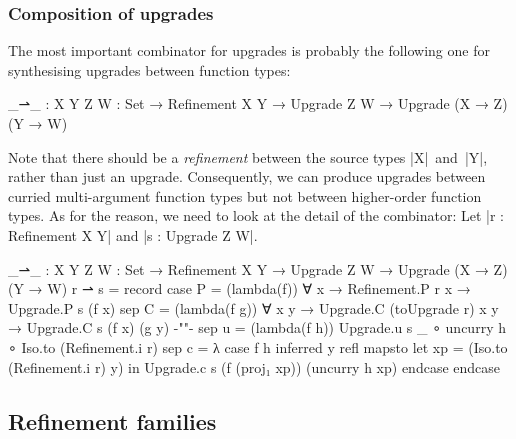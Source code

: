 \subsubsection{Composition of upgrades}
The most important combinator for upgrades is probably the following one for synthesising upgrades between function types:
\begin{code}
_⇀_ :  {X Y Z W : Set} →
       Refinement X Y → Upgrade Z W → Upgrade (X → Z) (Y → W)
\end{code}
Note that there should be a \emph{refinement} between the source types |X|~and~|Y|, rather than just an upgrade.
Consequently, we can produce upgrades between curried multi-argument function types but not between higher-order function types.
As for the reason, we need to look at the detail of the combinator:
Let |r : Refinement X Y| and |s : Upgrade Z W|.


\begin{code}
_⇀_ :  {X Y Z W : Set} →
       Refinement X Y → Upgrade Z W → Upgrade (X → Z) (Y → W)
r ⇀ s = record
  case   P  =  (lambda(f)) ∀ x → Refinement.P r x → Upgrade.P s (f x)
  sep    C  =  (lambda(f g)) ∀ x y  →  Upgrade.C (toUpgrade r)  x      y      →
                                       Upgrade.C s              (f x)  (g y)  {-""-}
  sep    u  =  (lambda(f h)) Upgrade.u s _ ∘ uncurry h ∘ Iso.to (Refinement.i r)
  sep    c  =  λ case f h inferred y refl mapsto  let  xp = (Iso.to (Refinement.i r) y)
                                                  in   Upgrade.c s (f (proj₁ xp)) (uncurry h xp) endcase endcase
\end{code}




\subsection{Refinement families}



